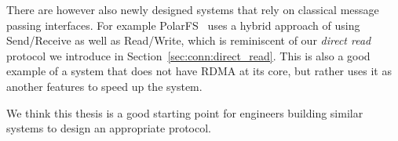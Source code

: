 There are however also newly designed systems that rely on classical message passing interfaces. For example 
PolarFS~\cite{polarfs} uses a hybrid approach of using Send/Receive as well as Read/Write, which is reminiscent of 
our \emph{direct read} protocol we introduce in Section~\ref{sec:conn:direct_read}. This is also a good example of a system 
that does not have RDMA at its core, but rather
uses it as another features to speed up the system. 

We think this thesis is a good starting point for engineers building similar systems to design an appropriate protocol.



